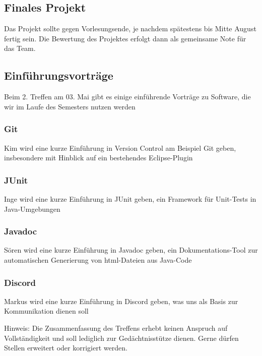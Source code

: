 \documentclass{article}
\begin{document}
\subsection*{Finales Projekt}
Das Projekt sollte gegen Vorlesungsende, je nachdem spätestens bis Mitte August fertig sein. Die Bewertung des Projektes erfolgt dann als gemeinsame Note für das Team.
\subsection*{Einführungsvorträge}
Beim 2. Treffen am 03. Mai gibt es einige einführende Vorträge zu Software, die wir im Laufe des Semesters nutzen werden
\subsubsection*{Git}
Kim wird eine kurze Einführung in Version Control am Beispiel Git geben, insbesondere mit Hinblick auf ein bestehendes Eclipse-Plugin
\subsubsection*{JUnit}
Inge wird eine kurze Einführung in JUnit geben, ein Framework für Unit-Tests in Java-Umgebungen
\subsubsection*{Javadoc}
Sören wird eine kurze Einführung in Javadoc geben, ein Dokumentations-Tool zur automatischen Generierung von html-Dateien aus Java-Code
\subsubsection*{Discord}
Markus wird eine kurze Einführung in Discord geben, was uns als Basis zur Kommunikation dienen soll

\vfill
Hinweis: Die Zusammenfassung des Treffens erhebt keinen Anspruch auf Vollständigkeit und soll lediglich zur Gedächtnisstütze dienen. Gerne dürfen Stellen erweitert oder korrigiert werden. 
\end{document}
